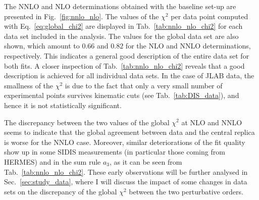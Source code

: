The NNLO and NLO determinations obtained with the baseline set-up are presented in Fig.~\ref{fig:nnlo_nlo}. The values of the $\chi^2$ per data point computed with Eq.~\eqref{eq:global_chi2} are displayed in Tab.~\ref{tab:nnlo_nlo_chi2} for each data set included in the analysis. The values for the global data set are also shown, which amount to $0.66$ and $0.82$ for the NLO and NNLO determinations, respectively. This indicates a general good description of the entire data set for both fits. A closer inspection of Tab.~\ref{tab:nnlo_nlo_chi2} reveals that a good description is achieved for all individual data sets. In the case of JLAB data, the smallness of the $\chi^2$ is due to the fact that only a very small number of experimental points survives kinematic cuts (see Tab.~\ref{tab:DIS_data}), and hence it is not statistically significant.%

The discrepancy between the two values of the global $\chi^2$ at NLO and NNLO seems to indicate that the global agreement between data and the central replica is worse for the NNLO case. Moreover, similar deteriorations of the fit quality show up in some SIDIS measurements (in particular those coming from HERMES) and in the sum rule $a_3$, as it can be seen from Tab.~\ref{tab:nnlo_nlo_chi2}. These early observations will be further analysed in Sec.~\ref{sec:study_data}, where I will discuss the impact of some changes in data sets on the discrepancy of the global $\chi^2$ between the two perturbative orders.

  
